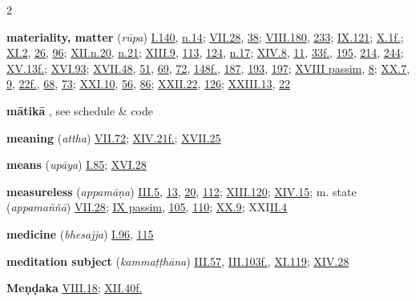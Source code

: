 \begin{multicols}{2}
\begin{vismHanging}
\par\textbf{materiality, matter} (\emph{rūpa}) \hyperlink{I.140}{I.140}{}, \hyperlink{I.n14}{n.14}{}; \hyperlink{VII.28}{VII.28}{}, \hyperlink{VII.38}{38}{}; \hyperlink{VIII.180}{VIII.180}{}, \hyperlink{VIII.233}{233}{}; \hyperlink{IX.121}{IX.121}{}; \hyperlink{X.1}{X.1f.}{}; \hyperlink{XI.2}{XI.2}{}, \hyperlink{XI.26}{26}{}, \hyperlink{XI.96}{96}{}; \hyperlink{XII.n20}{XII.n.20}{}, \hyperlink{XII.n21}{n.21}{}; \hyperlink{XIII.9}{XIII.9}{}, \hyperlink{XIII.113}{113}{}, \hyperlink{XIII.124}{124}{}, \hyperlink{XIII.n17}{n.17}{}; \hyperlink{XIV.8}{XIV.8}{}, \hyperlink{XIV.11}{11}{}, \hyperlink{XIV.33}{33f.}{}, \hyperlink{XIV.195}{195}{}, \hyperlink{XIV.214}{214}{}, \hyperlink{XIV.244}{244}{}; \hyperlink{XV.13}{XV.13f.}{}; \hyperlink{XVI.93}{XVI.93}{}; \hyperlink{XVII.48}{XVII.48}{}, \hyperlink{XVII.51}{51}{}, \hyperlink{XVII.69}{69}{}, \hyperlink{XVII.72}{72}{}, \hyperlink{XVII.148}{148f.}{}, \hyperlink{XVII.187}{187}{}, \hyperlink{XVII.193}{193}{}, \hyperlink{XVII.197}{197}{}; \hyperlink{XVIII}{XVIII passim}{}, \hyperlink{XVIII.8}{8}{}; \hyperlink{XX.7}{XX.7}{}, \hyperlink{XX.9}{9}{}, \hyperlink{XX.22}{22f.}{}, \hyperlink{XX.68}{68}{}, \hyperlink{XX.73}{73}{}; \hyperlink{XXI.10}{XXI.10}{}, \hyperlink{XXI.56}{56}{}, \hyperlink{XXI.86}{86}{}; \hyperlink{XXII.22}{XXII.22}{}, \hyperlink{XXII.126}{126}{}; \hyperlink{XXIII.13}{XXIII.13}{}, \hyperlink{XXIII.22}{22}{}
\par\textbf{mātikā} , see schedule \& code
\par\textbf{meaning} (\emph{attha}) \hyperlink{VII.72}{VII.72}{}; \hyperlink{XIV.21}{XIV.21f.}{}; \hyperlink{XVII.25}{XVII.25}{}
\par\textbf{means} (\emph{upāya}) \hyperlink{I.85}{I.85}{}; \hyperlink{XVI.28}{XVI.28}{}
\par\textbf{measureless} (\emph{appamāṇa}) \hyperlink{III.5}{III.5}{}, \hyperlink{III.13}{13}{}, \hyperlink{III.20}{20}{}, \hyperlink{III.112}{112}{}; \hyperlink{XIII.120}{XIII.120}{}; \hyperlink{XIV.15}{XIV.15}{}; m. state (\emph{appamaññā}) \hyperlink{VII.28}{VII.28}{}; \hyperlink{IX}{IX passim}{}, \hyperlink{IX.105}{105}{}, \hyperlink{IX.110}{110}{}; \hyperlink{XX.9}{XX.9}{}; XXI\hyperlink{II.4}{II.4}{}
\par\textbf{medicine} (\emph{bhesajja}) \hyperlink{I.96}{I.96}{}, \hyperlink{I.115}{115}{}
\par\textbf{meditation subject} (\emph{kammaṭṭhāna}) \hyperlink{III.57}{III.57}{}, \hyperlink{III.103}{III.103f.}{}, \hyperlink{XI.119}{XI.119}{}; \hyperlink{XIV.28}{XIV.28}{}
\par\textbf{Meṇḍaka} \hyperlink{VIII.18}{VIII.18}{}; \hyperlink{XII.40}{XII.40f.}{}

\end{vismHanging}
\end{multicols}
